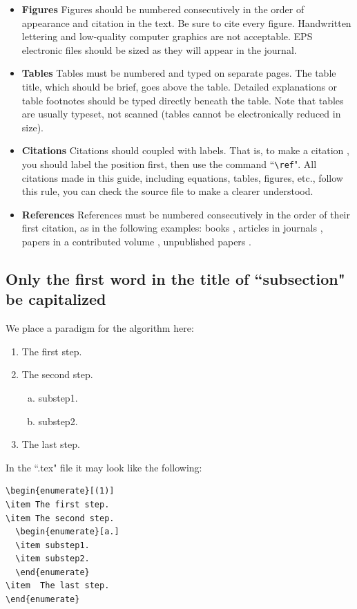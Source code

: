 \documentclass[print]{jicspack}
\begin{document}
\begin{itemize}
it as ``($n$)", where $n$ is the sequence number of steps. For the
sub-items label them as ``a.", ``b." , etc., see section
\ref{sec:1.1}. \item{\bf Figures} Figures should be numbered
consecutively in the order of appearance and citation in the text.
Be sure to cite every figure. Handwritten lettering and
low-quality computer graphics are not acceptable. EPS electronic
files should be sized as they will appear in the journal.
\item{\bf Tables} Tables must be numbered and typed on separate
pages. The table title, which should be brief, goes above the
table. Detailed explanations or table footnotes should be typed
directly beneath the table. Note that tables are usually typeset,
not scanned (tables cannot be electronically reduced in size).
\item{\bf Citations} Citations should coupled with labels. That
is, to make a citation , you should label the position first, then
use the command ``\verb|\ref|". All citations made in this guide,
including equations, tables, figures, etc., follow this rule, you
can check the source file to make a clearer understood. \item{\bf
References} References must be numbered consecutively in the order
of their first citation, as in the following examples: books
\cite{NumeApp,texbook}, articles in journals \cite{UncaliEu},
papers in a contributed volume \cite{Deformation,canonical},
unpublished papers \cite{SpaceDeform}.
\end{itemize}
\subsection{Only the first word in the title of ``subsection" be capitalized}
\label{sec:1.1}
We place a paradigm for the algorithm here:
\begin{enumerate}[(1)]
\item The first step.
\item The second step.
  \begin{enumerate}[a.]
  \item substep1.
  \item substep2.
  \end{enumerate}
\item  The last step.
\end{enumerate}
In the ``.tex" file it may look like the following:
\begin{verbatim}
\begin{enumerate}[(1)]
\item The first step.
\item The second step.
  \begin{enumerate}[a.]
  \item substep1.
  \item substep2.
  \end{enumerate}
\item  The last step.
\end{enumerate}
\end{verbatim}
\end{document}
